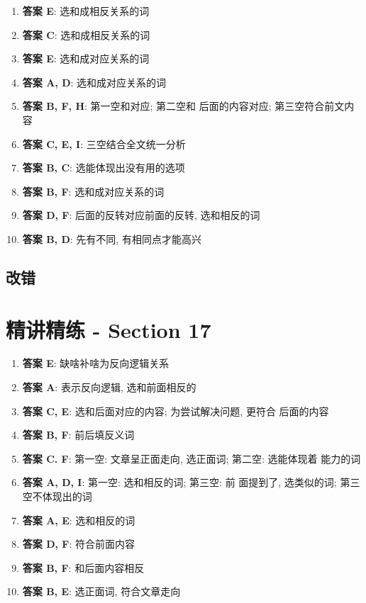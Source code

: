   \begin{enumerate}
    \item \textbf{答案 E}: 选和成相反关系的词
    \item \textbf{答案 C}: 选和成相反关系的词
    \item \textbf{答案 E}: 选和成对应关系的词
    \item \textbf{答案 A, D}: 选和成对应关系的词
    \item \textbf{答案 B, F, H}: 第一空和对应; 第二空和
    后面的内容对应; 第三空符合前文内容
    \item \textbf{答案 C, E, I}: 三空结合全文统一分析
    \item \textbf{答案 B, C}: 选能体现出没有用的选项
    \item \textbf{答案 B, F}: 选和成对应关系的词
    \item \textbf{答案 D, F}: 后面的反转对应前面的反转, 选和相反的词
    \item \textbf{答案 B, D}: 先有不同, 有相同点才能高兴
  \end{enumerate}

  \subsection{改错}

\section{精讲精练 - Section 17}

  \begin{enumerate}
    \item \textbf{答案 E}: 缺啥补啥为反向逻辑关系
    \item \textbf{答案 A}: 表示反向逻辑, 选和前面相反的
    \item \textbf{答案 C, E}: 选和后面对应的内容; 为尝试解决问题, 更符合
    后面的内容
    \item \textbf{答案 B, F}: 前后填反义词
    \item \textbf{答案 C. F}: 第一空: 文章呈正面走向, 选正面词; 第二空: 选能体现着
    能力的词
    \item \textbf{答案 A, D, I}: 第一空: 选和相反的词; 第三空: 前
    面提到了, 选类似的词; 第三空不体现出的词
    \item \textbf{答案 A, E}: 选和相反的词
    \item \textbf{答案 D, F}: 符合前面内容
    \item \textbf{答案 B, F}: 和后面内容相反
    \item \textbf{答案 B, E}: 选正面词, 符合文章走向
  \end{enumerate}

